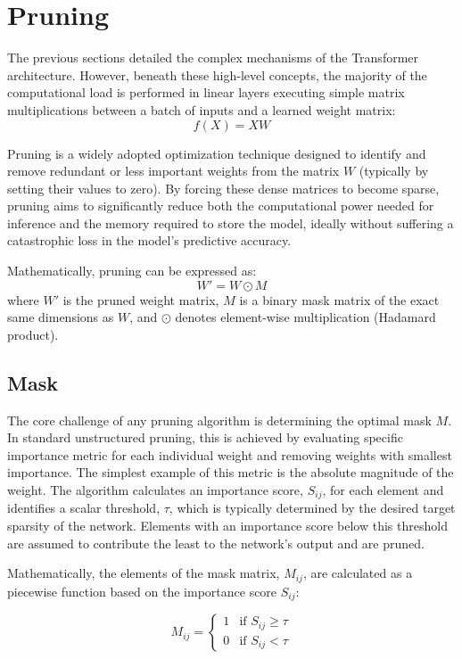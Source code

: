 \section{Pruning}
\label{sec:pruning}

The previous sections detailed the complex mechanisms of the Transformer architecture. However, beneath these high-level concepts, the majority of the computational load is performed in linear layers executing simple matrix multiplications between a batch of inputs and a learned weight matrix: 
$$ f(X) = XW $$

Pruning \cite{hoefler2021sparsitydeeplearningpruning} is a widely adopted optimization technique designed to identify and remove redundant or less important weights from the matrix $W$ (typically by setting their values to zero). By forcing these dense matrices to become sparse, pruning aims to significantly reduce both the computational power needed for inference and the memory required to store the model, ideally without suffering a catastrophic loss in the model's predictive accuracy.

Mathematically, pruning can be expressed as:
$$ W' = W \odot M $$
where $W'$ is the pruned weight matrix, $M$ is a binary mask matrix of the exact same dimensions as $W$, and $\odot$ denotes element-wise multiplication (Hadamard product).

\subsection*{Mask}

The core challenge of any pruning algorithm is determining the optimal mask $M$. In standard unstructured pruning, this is achieved by evaluating specific importance metric for each individual weight and removing weights with smallest importance. The simplest example of this metric is the absolute magnitude of the weight. The algorithm calculates an importance score, $S_{ij}$, for each element and identifies a scalar threshold, $\tau$, which is typically determined by the desired target sparsity of the network. Elements with an importance score below this threshold are assumed to contribute the least to the network's output and are pruned.

Mathematically, the elements of the mask matrix, $M_{ij}$, are calculated as a piecewise function based on the importance score $S_{ij}$:

$$ M_{ij} = \begin{cases} 
      1 & \text{if } S_{ij} \ge \tau \\
      0 & \text{if } S_{ij} < \tau 
   \end{cases} 
$$

